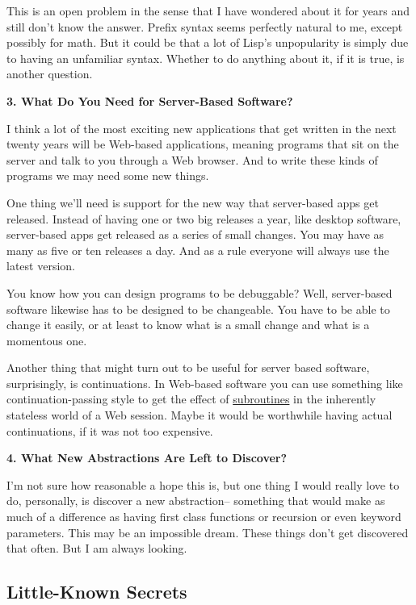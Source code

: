 This is an open problem in the sense that I have wondered about it for
years and still don't know the answer. Prefix syntax seems perfectly
natural to me, except possibly for math. But it could be that a lot of
Lisp's unpopularity is simply due to having an unfamiliar syntax.
Whether to do anything about it, if it is true, is another question.

\textbf{3. What Do You Need for Server-Based Software?}

I think a lot of the most exciting new applications that get written in
the next twenty years will be Web-based applications, meaning programs
that sit on the server and talk to you through a Web browser. And to
write these kinds of programs we may need some new things.

One thing we'll need is support for the new way that server-based apps
get released. Instead of having one or two big releases a year, like
desktop software, server-based apps get released as a series of small
changes. You may have as many as five or ten releases a day. And as a
rule everyone will always use the latest version.

You know how you can design programs to be debuggable? Well,
server-based software likewise has to be designed to be changeable. You
have to be able to change it easily, or at least to know what is a small
change and what is a momentous one.

Another thing that might turn out to be useful for server based
software, surprisingly, is continuations. In Web-based software you can
use something like continuation-passing style to get the effect of
\href{lwba.html}{subroutines} in the inherently stateless world of a Web
session. Maybe it would be worthwhile having actual continuations, if it
was not too expensive.

\textbf{4. What New Abstractions Are Left to Discover?}

I'm not sure how reasonable a hope this is, but one thing I would really
love to do, personally, is discover a new abstraction-- something that
would make as much of a difference as having first class functions or
recursion or even keyword parameters. This may be an impossible dream.
These things don't get discovered that often. But I am always looking.

\subsection{Little-Known Secrets}\label{little-known-secrets}

